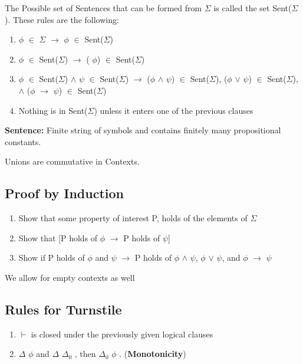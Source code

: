 \documentclass[11pt]{article}
\begin{document}
The Possible set of Sentences that can be formed from \(\Sigma\) is called
the set Sent(\(\Sigma\)). These rules are the following:

\begin{enumerate}
\item \(\phi\) \(\in\) \(\Sigma\) \(\rightarrow\) \(\phi\) \(\in\) Sent(\(\Sigma\))
\item \(\phi\) \(\in\) Sent(\(\Sigma\)) \(\rightarrow\) (\textlnot{} \(\phi\)) \(\in\) Sent(\(\Sigma\))
\item \(\phi\) \(\in\) Sent(\(\Sigma\)) \(\wedge\) \(\psi\) \(\in\) Sent(\(\Sigma\)) \(\rightarrow\) (\(\phi\) \(\wedge\) \(\psi\)) \(\in\) Sent(\(\Sigma\)), (\(\phi\) \(\vee\) \(\psi\)) \(\in\) Sent(\(\Sigma\)), \(\wedge\)  (\(\phi\) \(\rightarrow\) \(\psi\)) \(\in\) Sent(\(\Sigma\))
\item Nothing is in Sent(\(\Sigma\)) unless it enters one of the previous clauses
\end{enumerate}

\textbf{Sentence:} Finite string of symbols and contains finitely many propositional constants.

Unions are commutative in Contexts.
\subsection{Proof by Induction}
\label{sec:orga34768e}
\begin{enumerate}
\item Show that some property of interest P, holds of the elements of \(\Sigma\)
\item Show that [P holds of \(\phi\) \(\rightarrow\) P holds of \(\psi\)]
\item Show if P holds of \(\phi\) and \(\psi\) \(\rightarrow\) P holds of \(\phi\) \(\wedge\) \(\psi\), \(\phi\) \(\vee\) \(\psi\), and \(\phi\) \(\rightarrow\) \(\psi\)
\end{enumerate}

We allow for empty contexts as well

\subsection{Rules for Turnstile}
\label{sec:orgb115617}
\begin{enumerate}
\item \(\vdash\) is closed under the previously given logical clauses
\item \(\Delta\) \vdash \(\phi\) and \(\Delta\) \subseteq \(\Delta_0\) , then \(\Delta_0\) \vdash \(\phi\) . (\textbf{Monotonicity})
\end{enumerate}
\end{document}
